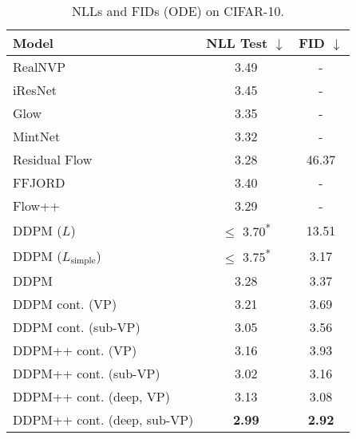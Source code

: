 \documentclass{article} \usepackage{iclr2021_conference,times}
\begin{document}
\begin{table}
\begin{minipage}[t]{0.48\textwidth}
\vspace{-0.3cm}
\begin{table}[H]
\centering
\caption{NLLs and FIDs (ODE) on CIFAR-10. }\label{tab:bpd}\vspace{-1em}
\footnotesize
 \setlength\tabcolsep{3.5pt}
\begin{adjustbox}{max width=\textwidth}
    \begin{tabular}{l c c}
    \toprule
    Model & NLL Test $\downarrow$ & FID $\downarrow$\\
    \midrule
    RealNVP~\citep{dinh2016density} & 3.49 & -\\
    iResNet~\citep{behrmann2019invertible} & 3.45 & -\\
    Glow~\citep{kingma2018glow} & 3.35 & - \\
    MintNet~\citep{song2019mintnet} & 3.32 & - \\
    Residual Flow~\citep{chen2019residual} & 3.28 & 46.37\\
    FFJORD~\citep{grathwohl2018ffjord} & 3.40 & -\\
    Flow++~\citep{ho2019flow++} & 3.29 & -\\
    DDPM ($L$)~\citep{ho2020denoising} & $\leq$ 3.70\textsuperscript{*} & 13.51\\
    DDPM ($L_{\text{simple}}$)~\citep{ho2020denoising} & $\leq$ 3.75\textsuperscript{*} & 3.17\\
    \midrule
    DDPM & 3.28 & 3.37\\\relax
    DDPM cont. (VP) & 3.21 & 3.69\\\relax
    DDPM cont. (sub-VP) & 3.05 & 3.56\\\relax
    DDPM++ cont. (VP) & 3.16 & 3.93\\\relax
    DDPM++ cont. (sub-VP) & 3.02 & 3.16\\ \relax
    DDPM++ cont. (deep, VP) & 3.13 & 3.08\\ \relax
    DDPM++ cont. (deep, sub-VP) & \textbf{2.99} & \textbf{2.92} \\
    \bottomrule
    \end{tabular}
\end{adjustbox}
\end{table}
\end{minipage}\hfil
\begin{minipage}[t]{0.48\textwidth}
\vspace{-0.3cm}
\begin{table}[H]

\end{table}
\end{minipage}
\end{table}
\end{document}
